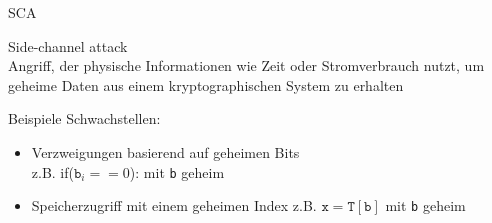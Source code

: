 \begin{frame}{SCA}
    \begin{definitionblock}{Side-channel attack}
        \\ Angriff, der physische Informationen wie Zeit oder Stromverbrauch nutzt, um geheime Daten aus einem kryptographischen System zu erhalten
    \end{definitionblock}
    \vspace{1em}
    Beispiele Schwachstellen:
    \begin{itemize}
        \item Verzweigungen basierend auf geheimen Bits\\
        z.B. if($\texttt{b$_i$}==0$): mit \texttt{b} geheim
        \item Speicherzugriff mit einem geheimen Index
        z.B. $\texttt{x}=\texttt{T}[\texttt{b}]$ mit \texttt{b} geheim
    \end{itemize}
\end{frame}